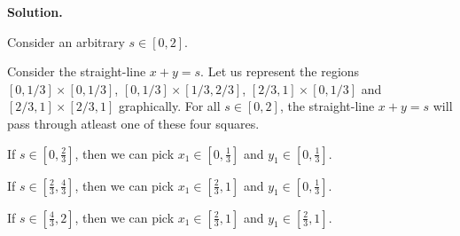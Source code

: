 \documentclass[10pt]{article}
\begin{document}
\textbf{Solution.} 



Consider an arbitrary $\displaystyle s\in [ 0,2]$.



Consider the straight-line $\displaystyle x+y=s$. Let us represent the regions $\displaystyle [ 0,1/3] \times [ 0,1/3]$, $\displaystyle [ 0,1/3] \times [ 1/3,2/3]$, $\displaystyle [ 2/3,1] \times [ 0,1/3]$ and $\displaystyle [ 2/3,1] \times [ 2/3,1]$ graphically. For all $\displaystyle s\in [ 0,2]$, the straight-line $\displaystyle x+y=s$ will pass through atleast one of these four squares. 



If $\displaystyle s\in \left[ 0,\frac{2}{3}\right]$, then we can pick $\displaystyle x_{1} \in \left[ 0,\frac{1}{3}\right]$ and $\displaystyle y_{1} \in \left[ 0,\frac{1}{3}\right]$. 

If $\displaystyle s\in \left[\frac{2}{3} ,\frac{4}{3}\right]$, then we can pick $\displaystyle x_{1} \in \left[\frac{2}{3} ,1\right]$ and $\displaystyle y_{1} \in \left[ 0,\frac{1}{3}\right]$.



If $\displaystyle s\in \left[\frac{4}{3} ,2\right]$, then we can pick $\displaystyle x_{1} \in \left[\frac{2}{3} ,1\right]$ and $\displaystyle y_{1} \in \left[\frac{2}{3} ,1\right]$.






\end{document}
